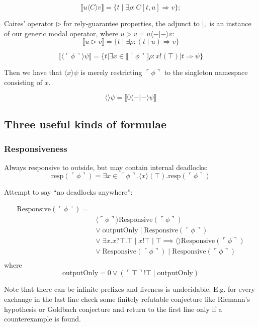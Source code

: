 \documentclass{llncs}
\newcommand{\interp}[1]{\llbracket #1 \rrbracket}
\newcommand{\maps}{\colon}
\newcommand{\lpquote}{\ulcorner}
\newcommand{\rpquote}{\urcorner}
\newcommand{\quotep}[1]{\lpquote #1 \rpquote}
\begin{document}
\[ \interp{u \langle C\rangle v} = \{ t \;|\; \exists \rho\maps C[t, u] \Rightarrow v \}; \]

Caires' \cite{Caires} operator $\triangleright$ for rely-guarantee properties, the adjunct to $|,$ is an instance of our generic modal operator, where $u \triangleright v = u \langle - | - \rangle v:$
\[ \interp{u \triangleright v} = \{ t \;|\; \exists \rho\maps (t\;|\;u) \Rightarrow v\} \]

\[\interp{ \langle \quotep{\phi} \rangle \psi } = \{ t | \exists x\in\interp{\quotep{\phi}} \rho : x!(\top) | t \Rightarrow \psi \}\]

Then we have that $\langle x \rangle \psi$ is merely restricting $\quotep{\phi}$ to the singleton namespace consisting of $x$.

\[ \langle \rangle \psi = \interp{ 0 \langle -|- \rangle \psi } \]

\subsection{Three useful kinds of formulae}
\subsubsection{Responsiveness}
Always responsive to outside, but may contain internal deadlocks:
\[ \mbox{resp}(\quotep{\phi}) = \exists x \in \quotep{\phi} . \langle x\rangle(\top).\mbox{resp}(\quotep{\phi}) \]


Attempt to say ``no deadlocks anywhere'':

\[\begin{array}{rl}
  \mbox{Responsive}( \quotep{\phi} ) = & \\
  & \langle \quotep{\phi} \rangle \mbox{Responsive}(\quotep{\phi}) \\
  & \lor\; \mbox{outputOnly}\; | \;\mbox{Responsive}(\quotep{\phi}) \\
  & \lor\; \exists x. x?\top.\top \;|\; x!\top \;|\; \top \implies \langle\rangle \mbox{Responsive}(\quotep{\phi})\\
  & \lor\; \mbox{Responsive}(\quotep{\phi}) \; | \;\mbox{Responsive}(\quotep{\phi}) \\  
\end{array}\]
where
\[ \mbox{outputOnly} = 0 \lor ( \quotep{\top} ! \top \;|\; \mbox{outputOnly} ) \]

Note that there can be infinite prefixes and liveness is undecidable.  E.g. for every exchange in the last line check some finitely refutable conjecture like Riemann's hypothesis or Goldbach conjecture and return to the first line only if a counterexample is found.
\end{document}
